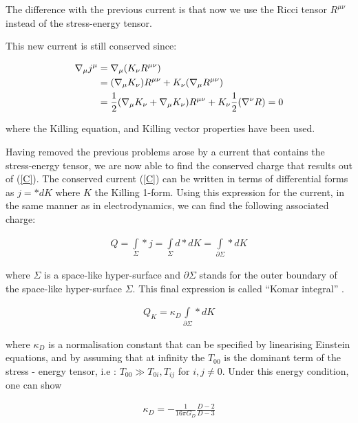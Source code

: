 \documentclass[a4paper,notitlepage]{report}
\begin{document}
\vspace{0.5 em}
The difference with the previous current is that now we use the Ricci tensor $R^{\mu\nu}$ instead of the stress-energy tensor. 

This new current is still conserved since:

\begin{align}
\nabla_{\mu} j^\mu &= \nabla_{\mu} (K_\nu R^{\mu\nu}) \\ \notag
& = (\nabla_{\mu}K_\nu) R^{\mu\nu} + K_\nu (\nabla_{\mu}R^{\mu\nu}) \\ \notag
& = \frac{1}{2} (\nabla_{\mu}K_\nu + \nabla_{\mu}K_\nu) R^{\mu\nu} + K_\nu \frac{1}{2} (\nabla^{\nu}R) = 0 
\end{align}

\vspace{0.5 em}
where the Killing equation, and Killing vector properties have been used.

Having removed the previous problems arose by a current that contains the stress-energy tensor, we are now able to find the conserved charge that results out of (\ref{C}). The conserved current (\ref{C}) can be written in terms of differential forms as $j = *dK$ where $K$ the Killing 1-form. Using this expression for the current, in the same manner as in electrodynamics, we can find the following associated charge:

\begin{align}
Q = \int\limits_{\Sigma} *j = \int\limits_{\Sigma} d*dK = \int\limits_{\partial\Sigma} *dK 
\end{align}

\vspace{0.5 em}
where $\Sigma$ is a space-like hyper-surface and $\partial\Sigma$ stands for the outer boundary of the space-like hyper-surface $\Sigma$. This final expression is called ``Komar integral'' \cite{komar1963positive}.

\begin{align}\label{D}
Q_{K} = \kappa_{D} \int\limits_{\partial\Sigma} *dK
\end{align}

\vspace{0.5 em}
where $\kappa_D$ is a normalisation constant that can be specified by linearising Einstein equations, and by assuming that at infinity the $T_{00}$ is the dominant term of the stress - energy tensor, i.e : $T_{00} \gg T_{0i},T_{ij}$ for $i,j \not= 0$. Under this energy condition, one can show \cite{gibbonsglobal}

\begin{align}
\kappa_{D} = - \frac{1}{16\pi G_{D}} \frac{D-2}{D-3}
\end{align}
\end{document}
